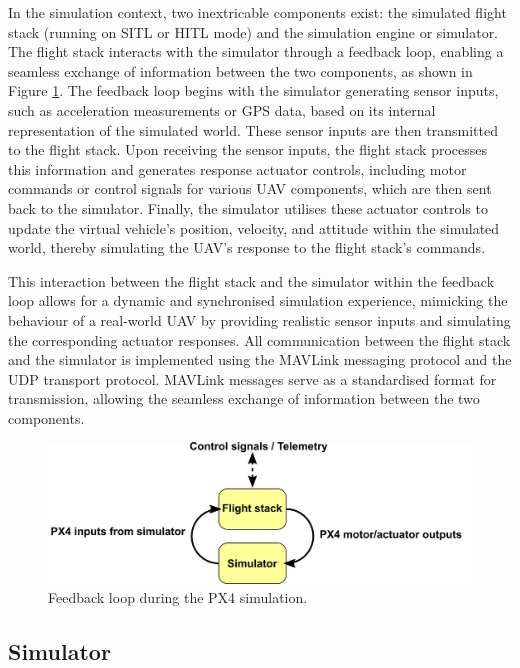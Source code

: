 In the simulation context, two inextricable components exist: the simulated flight stack (running on SITL or HITL mode) and the simulation engine or simulator. The flight stack interacts with the simulator through a feedback loop, enabling a seamless exchange of information between the two components, as shown in Figure \ref{fig:simulator-loop}.
The feedback loop begins with the simulator generating sensor inputs, such as acceleration measurements or GPS data, based on its internal representation of the simulated world. These sensor inputs are then transmitted to the flight stack.
Upon receiving the sensor inputs, the flight stack processes this information and generates response actuator controls, including motor commands or control signals for various UAV components, which are then sent back to the simulator. Finally, the simulator utilises these actuator controls to update the virtual vehicle's position, velocity, and attitude within the simulated world, thereby simulating the UAV's response to the flight stack's commands. 

This interaction between the flight stack and the simulator within the feedback loop allows for a dynamic and synchronised simulation experience, mimicking the behaviour of a real-world UAV by providing realistic sensor inputs and simulating the corresponding actuator responses.
All communication between the flight stack and the simulator is implemented using the MAVLink messaging protocol and the UDP transport protocol. MAVLink messages serve as a standardised format for transmission, allowing the seamless exchange of information between the two components.

\begin{figure}
  \centering
  \includegraphics[width=\textwidth,keepaspectratio]{img/px4-simulator-loop.png}
  \caption{Feedback loop during the PX4 simulation.}
  \label{fig:simulator-loop}
\end{figure}

\subsection{Simulator}


